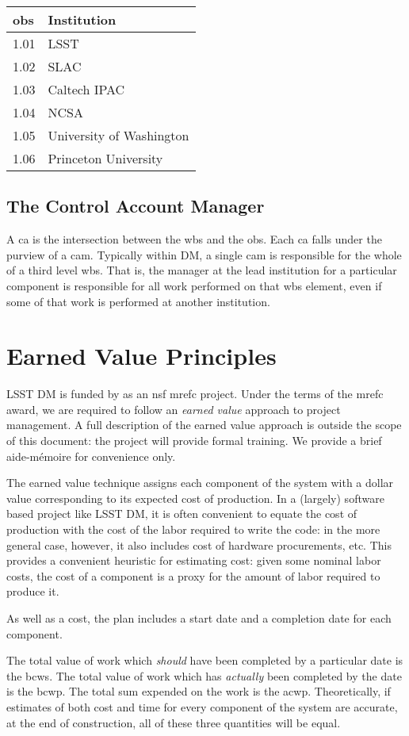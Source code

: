 \begin{longtable}[]{@{}ll@{}}
\hline
\gls{obs} & Institution\tabularnewline
\hline
\endhead
1.01 & LSST\tabularnewline
1.02 & SLAC\tabularnewline
1.03 & Caltech IPAC\tabularnewline
1.04 & NCSA\tabularnewline
1.05 & University of Washington\tabularnewline
1.06 & Princeton University\tabularnewline
\hline
\end{longtable}

\subsection{The Control Account
Manager}\label{the-control-account-manager}

A \gls{ca} is the intersection between the \gls{wbs} and the \gls{obs}.
Each \gls{ca} falls under the purview of a \gls{cam}.
Typically within DM, a single \gls{cam} is responsible for the whole of a third level \gls{wbs}.
That is, the manager at the lead institution for a particular component is responsible for all work performed on that \gls{wbs} \gls{element}, even if some of that work is performed at another institution.

\section{Earned Value Principles}
\label{sec:evms}

LSST DM is funded by as an \gls{nsf} \gls{mrefc} project.
Under the terms of the \gls{mrefc} award, we are required to follow an \emph{earned value} approach to project management.
A full description of the earned value approach is outside the scope of this document: the project will provide formal training.
We provide a brief aide-m\'emoire for convenience only.

The earned value technique assigns each component of the system with a
dollar value corresponding to its expected cost of production. In a
(largely) software based project like LSST DM, it is often convenient to
equate the cost of production with the cost of the labor required to
write the code: in the more general case, however, it also includes cost
of hardware procurements, etc. This provides a convenient heuristic for
estimating cost: given some nominal labor costs, the cost of a component
is a proxy for the amount of labor required to produce it.

As well as a cost, the plan includes a start date and a completion date
for each component.

The total value of work which \emph{should} have been completed by a particular date is the \gls{bcws}.
The total value of work which has \emph{actually} been completed by the date is the \gls{bcwp}.
The total sum expended on the work is the \gls{acwp}.
Theoretically, if estimates of both cost and time for every component of the system are accurate, at the end of construction, all of these three quantities will be equal.

